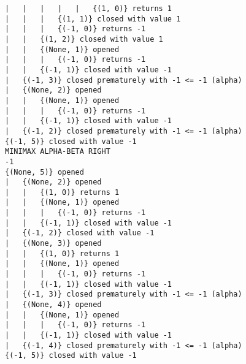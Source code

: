 \documentclass{article}
\begin{document}
\begin{verbatim}
|   |   |   |   |   {(1, 0)} returns 1
|   |   |   {(1, 1)} closed with value 1
|   |   |   {(-1, 0)} returns -1
|   |   {(1, 2)} closed with value 1
|   |   {(None, 1)} opened
|   |   |   {(-1, 0)} returns -1
|   |   {(-1, 1)} closed with value -1
|   {(-1, 3)} closed prematurely with -1 <= -1 (alpha)
|   {(None, 2)} opened
|   |   {(None, 1)} opened
|   |   |   {(-1, 0)} returns -1
|   |   {(-1, 1)} closed with value -1
|   {(-1, 2)} closed prematurely with -1 <= -1 (alpha)
{(-1, 5)} closed with value -1
MINIMAX ALPHA-BETA RIGHT
-1
{(None, 5)} opened
|   {(None, 2)} opened
|   |   {(1, 0)} returns 1
|   |   {(None, 1)} opened
|   |   |   {(-1, 0)} returns -1
|   |   {(-1, 1)} closed with value -1
|   {(-1, 2)} closed with value -1
|   {(None, 3)} opened
|   |   {(1, 0)} returns 1
|   |   {(None, 1)} opened
|   |   |   {(-1, 0)} returns -1
|   |   {(-1, 1)} closed with value -1
|   {(-1, 3)} closed prematurely with -1 <= -1 (alpha)
|   {(None, 4)} opened
|   |   {(None, 1)} opened
|   |   |   {(-1, 0)} returns -1
|   |   {(-1, 1)} closed with value -1
|   {(-1, 4)} closed prematurely with -1 <= -1 (alpha)
{(-1, 5)} closed with value -1
\end{verbatim}
\end{document}
